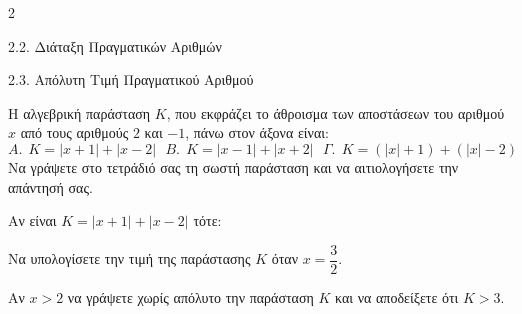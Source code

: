 \begin{ylh}{2}
    \item 2.2. Διάταξη Πραγματικών Αριθμών
    \item 2.3. Απόλυτη Τιμή Πραγματικού Αριθμού
\end{ylh}

\begin{alist}
\item Η αλγεβρική παράσταση $K$, που εκφράζει το άθροισμα των αποστάσεων του αριθμού $x$ από τους αριθμούς $2$ και $-1$, πάνω στον άξονα είναι:
\[A\textbf{.}\ \ K=|x+1|+|x-2|\ \ \ B\textbf{.}\ \  K=| x-1|+| x+2|\ \ \ \varGamma\textbf{.}\ \ K=(| x|+1)+(| x|-2)\]
Να γράψετε στο τετράδιό σας τη σωστή παράσταση και να αιτιολογήσετε την απάντησή σας.
\item Αν είναι $K=| x+1| + |x-2|$ τότε:
\begin{rlist}
\item Να υπολογίσετε την τιμή της παράστασης $K$ όταν $x = \dfrac{3}{2}$.
\item Αν $x>2$ να γράψετε χωρίς απόλυτο την παράσταση $K$ και να αποδείξετε ότι $K>3$.
\end{rlist}
\end{alist}

